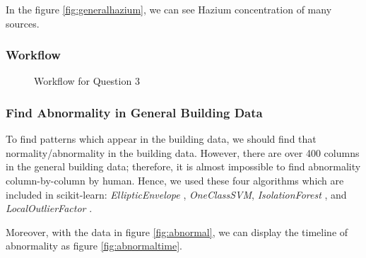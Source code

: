 \documentclass[aps, 10pt, a4paper]{article}
\begin{document}
                In the figure \ref{fig:generalhazium}, we can see Hazium concentration of many sources. 

            \subsubsection{Workflow}
                \begin{figure}[htbp]
                    \centering
                    \begin{tikzpicture}[node distance = 2cm, auto]
                    \end{tikzpicture}
                    \caption{Workflow for Question 3}
                    \label{fig:workflow3}
                \end{figure}
            
            \subsubsection{Find Abnormality in General Building Data}       
                To find patterns which appear in the building data, we should find that normality/abnormality in the building data. However, there are over 400 columns in the general building data; therefore, it is almost impossible to find abnormality column-by-column by human. Hence, we used these four algorithms which are included in scikit-learn: \textit{EllipticEnvelope} \cite{ref:normal1}, \textit{OneClassSVM}, \textit{IsolationForest} \cite{ref:normal2, ref:normal3}, and \textit{LocalOutlierFactor} \cite{ref:normal4}.
            
                Moreover, with the data in figure \ref{fig:abnormal}, we can display the timeline of abnormality as figure \ref{fig:abnormaltime}.
                
\end{document}
